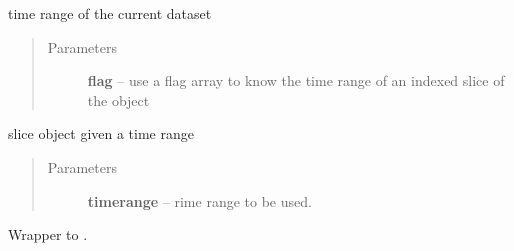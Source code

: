 \documentclass[letterpaper,10pt,english]{sphinxmanual}
\begin{document}
\begin{fulllineitems}
\begin{fulllineitems}
\begin{quote}
\begin{description}
\end{description}\end{quote}

\end{fulllineitems}


\begin{fulllineitems}
\label{altimetry.data:altimetry.data.hydro_data.time_range}
time range of the current dataset
\begin{quote}\begin{description}
\item[{Parameters}] \leavevmode
\textbf{flag} -- use a flag array to know the time range of an indexed slice of the object

\end{description}\end{quote}

\end{fulllineitems}


\begin{fulllineitems}
\label{altimetry.data:altimetry.data.hydro_data.time_slice}
slice object given a time range
\begin{quote}\begin{description}
\item[{Parameters}] \leavevmode
\textbf{timerange} -- rime range to be used.

\end{description}\end{quote}

\end{fulllineitems}


\begin{fulllineitems}
\label{altimetry.data:altimetry.data.hydro_data.update}
Wrapper to {\hyperref[altimetry.data:altimetry.data.hydro_data.update_with_slice]{}}.

\end{fulllineitems}


\end{fulllineitems}
\end{document}
